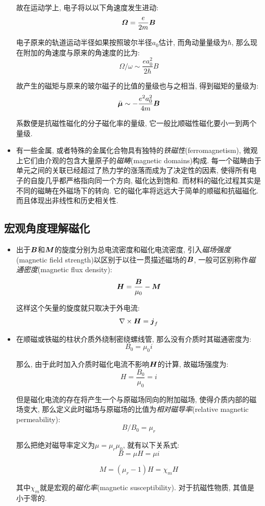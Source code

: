 \begin{itemize}
故在运动学上, 电子将以以下角速度发生进动:
\[\boldsymbol{\varOmega}=\frac{e}{2m}\boldsymbol{B}\]

电子原来的轨道运动半径如果按照玻尔半径$a_0$估计, 而角动量量级为$\hbar$, 那么现在附加的角速度与原来的角速度的比为:
\[\Omega/\omega\sim\frac{ea_0^2}{2\hbar}B\]

故产生的磁矩与原来的玻尔磁子的比值的量级也与之相当, 得到磁矩的量级为:
\[\bar{\boldsymbol{\mu}}\sim-\frac{e^2a_0^2	}{4m}\boldsymbol{B}\]

系数便是抗磁性磁化的分子磁化率的量级, 它一般比顺磁性磁化要小一到两个量级.

\item 有一些金属, 或者特殊的金属化合物具有独特的\emph{铁磁性}(ferromagnetism), 微观上它们由介观的包含大量原子的\emph{磁畴}(magnetic domains)构成. 每一个磁畴由于单元之间的关联已经超过了热力学的涨落而成为了决定性的因素, 使得所有电子的自旋几乎都严格指向同一个方向, 磁化达到饱和. 而材料的磁化过程其实是不同的磁畴在外磁场下的转向. 它的磁化率将远远大于简单的顺磁和抗磁磁化. 而且体现出非线性和历史相关性.


\end{itemize}

\subsection{宏观角度理解磁化}

\begin{itemize}
\item 出于$\boldsymbol{B}$和$\boldsymbol{M}$的旋度分别为总电流密度和磁化电流密度, 引入\emph{磁场强度}(magnetic field strength)以区别于以往一贯描述磁场的$\boldsymbol{B}$, 一般可区别称作\emph{磁通密度}(magnetic flux density):
\[\boldsymbol{H}=\frac{\boldsymbol{B}}{\mu_0}-\boldsymbol{M}\]

这样这个矢量的旋度就只取决于外电流:
\[\nabla\times \boldsymbol{H}=\boldsymbol{j}_f\]

\item 在顺磁或铁磁的柱状介质外绕制密绕螺线管, 那么没有介质时其磁通密度为:
\[B_0=\mu_0 i\]

那么, 由于此时加入介质时磁化电流不影响$\boldsymbol{H}$的计算, 故磁场强度为:
\[H=\frac{B_0}{\mu_0}=i\]

但是磁化电流的存在将产生一个与原磁场同向的附加磁场, 使得介质内部的磁场变大, 那么定义此时磁场与原磁场的比值为\emph{相对磁导率}(relative magnetic permeability):
\[B/B_0=\mu_r\]

那么把绝对磁导率定义为$\mu=\mu_r\mu_0$, 就有以下关系式:
\[B=\mu H=\mu i\]

\[M=(\mu_r-1)H=\chi_m H\]

其中$\chi_m$就是宏观的\emph{磁化率}(magnetic susceptibility). 对于抗磁性物质, 其值是小于零的.


\end{itemize}

